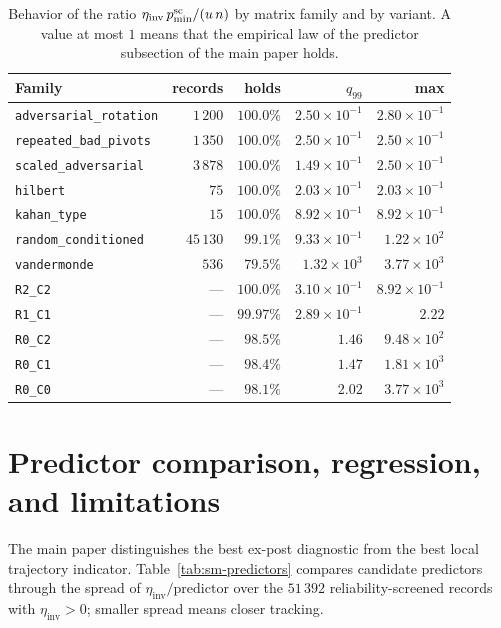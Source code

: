 \documentclass[supplement,review,onefignum,onetabnum]{siamart251216}
\begin{document}
\begin{table}
\centering
\caption{Behavior of the ratio $\eta_{\mathrm{inv}}\,p^{\rm sc}_{\min}/(u\,n)$ by matrix
family and by variant. A value at most $1$ means that the empirical law of the predictor subsection of the main paper holds.}
\label{tab:sm-law-by-family}
\begin{tabular}{lrrrr}
\hline
Family & records & holds & $q_{99}$ & max \\
\hline
\texttt{adversarial\_rotation} & $1\,200$ & $100.0\%$ & $2.50\times10^{-1}$ & $2.80\times10^{-1}$ \\
\texttt{repeated\_bad\_pivots} & $1\,350$ & $100.0\%$ & $2.50\times10^{-1}$ & $2.50\times10^{-1}$ \\
\texttt{scaled\_adversarial}   & $3\,878$ & $100.0\%$ & $1.49\times10^{-1}$ & $2.50\times10^{-1}$ \\
\texttt{hilbert}               & $75$     & $100.0\%$ & $2.03\times10^{-1}$ & $2.03\times10^{-1}$ \\
\texttt{kahan\_type}           & $15$     & $100.0\%$ & $8.92\times10^{-1}$ & $8.92\times10^{-1}$ \\
\texttt{random\_conditioned}   & $45\,130$& $99.1\%$  & $9.33\times10^{-1}$ & $1.22\times10^{2}$ \\
\texttt{vandermonde}           & $536$    & $79.5\%$  & $1.32\times10^{3}$ & $3.77\times10^{3}$ \\
\hline
\texttt{R2\_C2} & --- & $100.0\%$ & $3.10\times10^{-1}$ & $8.92\times10^{-1}$ \\
\texttt{R1\_C1} & --- & $99.97\%$ & $2.89\times10^{-1}$ & $2.22$ \\
\texttt{R0\_C2} & --- & $98.5\%$  & $1.46$ & $9.48\times10^{2}$ \\
\texttt{R0\_C1} & --- & $98.4\%$  & $1.47$ & $1.81\times10^{3}$ \\
\texttt{R0\_C0} & --- & $98.1\%$  & $2.02$ & $3.77\times10^{3}$ \\
\hline
\end{tabular}
\end{table}

\section{Predictor comparison, regression, and limitations}
\label{sm:regression}

The main paper distinguishes the best ex-post diagnostic from the best local trajectory indicator.
Table~\ref{tab:sm-predictors} compares candidate predictors through the spread of
$\eta_{\mathrm{inv}}/\text{predictor}$ over the $51\,392$ reliability-screened records with
$\eta_{\mathrm{inv}}>0$; smaller spread means closer tracking.
\end{document}
